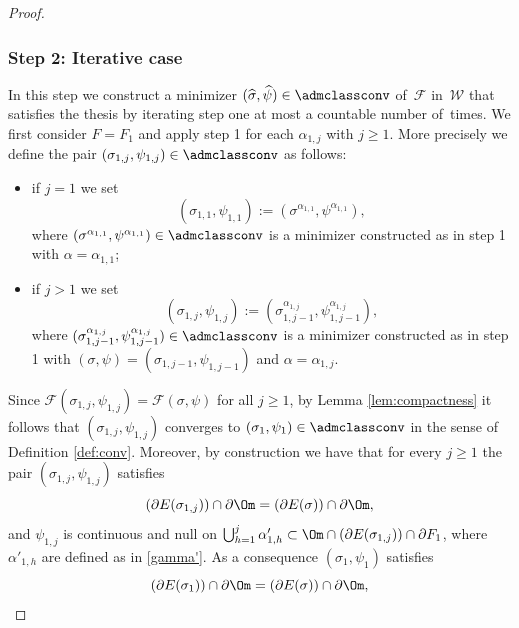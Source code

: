 \begin{proof}
\subsubsection*{Step 2: Iterative case} In this step we construct a minimizer $(\widehat\sigma,\widehat\psi)\in\admclassconv$ of~$\mathcal F$ in~$\mathcal W$ that satisfies the thesis by iterating step one at most a countable number of~times.
We first consider $F=F_1$ and apply step 1 for each $\alpha_{1,j}$ with $j\ge1$.
More precisely we define the pair $(\sigma_{1,j},\psi_{1,j})\in\admclassconv$ as follows:
\begin{itemize}
\item if $j=1$ we set\vspace*{-3pt}
\begin{equation*}
(\sigma_{1,1},\psi_{1,1}):=(\sigma^{\alpha_{1,1}},\psi^{\alpha_{1,1}} ),
\end{equation*}
where $(\sigma^{\alpha_{1,1}},\psi^{\alpha_{1,1}} )\in\admclassconv$ is a minimizer constructed as in step 1 with $\alpha=\alpha_{1,1}$;
\item if $j>1$ we set\vspace*{-3pt}
\begin{equation*}
(\sigma_{1,j},\psi_{1,j}):= (\sigma_{1,j-1}^{\alpha_{1,j}},\psi_{1,j-1}^{{\alpha}_{1,j}}),
\end{equation*}
where $(\sigma_{1,j-1}^{\alpha_{1,j}},\psi_{1,j-1}^{{\alpha}_{1,j}})\in\admclassconv$ is a minimizer constructed as in step 1 with $(\sigma,\psi)=(\sigma_{1,j-1},\psi_{1,j-1})$ and $\alpha=\alpha_{1,j}$.
\end{itemize}
Since
$
\mathcal{F}(\sigma_{1,j},\psi_{1,j})=\mathcal F(\sigma,\psi)
$
for all $j\ge1$, by Lemma \ref{lem:compactness} it follows that $(\sigma_{1,j},\psi_{1,j})$ converges to $(\sigma_1,\psi_1)\in\admclassconv$ in the sense of Definition \ref{def:conv}. Moreover, by construction we have that for every $j\ge1$ the pair $(\sigma_{1,j},\psi_{1,j})$ satisfies
\begin{equation*}
(\partial E(\sigma_{1,j}))\cap\partial\Om= (\partial E(\sigma))\cap\partial\Om,
\end{equation*}
and $\psi_{1,j}$ is continuous and null on $\bigcup_{h=1}^j\alpha'_{1,h}\subset \Om\cap(\partial E(\sigma_{1,j}))\cap\partial F_1$,
where $\alpha'_{1,h}$ are defined as in \eqref{gamma'}. As a consequence $(\sigma_1,\psi_1)$ satisfies
\begin{equation*}
(\partial E(\sigma_{1}))\cap\partial\Om= (\partial E(\sigma))\cap\partial\Om,
\end{equation*}

\end{proof}

